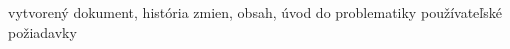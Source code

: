 \begin{versionhistory}
    {vytvorený dokument, história zmien, obsah, úvod do problematiky}
    {používateľské požiadavky}
\end{versionhistory}